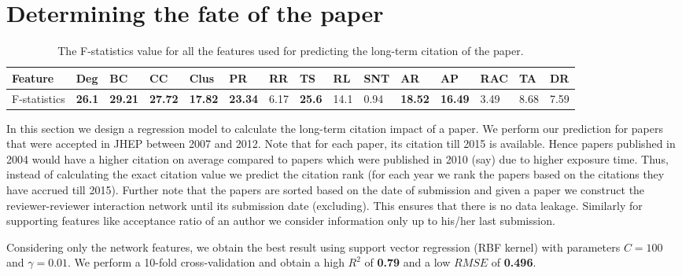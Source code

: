 \section{Determining the fate of the paper}
\label{performance_measure}

\begin{table*}[]
\centering
\caption{The F-statistics value for all the features used for predicting the long-term citation of the paper.}
\label{tab:f_score}
 \begin{adjustbox}{max width=\textwidth}
\begin{tabular}{|l|l|l|l|l|l|l|l|l|l|l|l|l|l|l|}
\hline
Feature      & Deg  & BC    & CC    & Clus  & PR    & RR   & TS   & RL   & SNT  & AR    & AP    & RAC  & TA   & DR   \\ \hline
F-statistics & {\bf 26.1} & {\bf 29.21} & {\bf 27.72} & {\bf 17.82} & {\bf 23.34} & 6.17 & {\bf 25.6} & 14.1 & 0.94 & {\bf 18.52} & {\bf 16.49} & 3.49 & 8.68 & 7.59 \\ \hline
\end{tabular}
\end{adjustbox}
\vspace{4mm}
\end{table*}


In this section we design a regression model to calculate the long-term citation impact of a paper. 
We perform our prediction for papers that were accepted in JHEP between 2007 and 2012. Note that for each paper, its citation till 2015 is available. Hence papers published in 2004 would have a higher citation on average compared to papers which were published in 2010 (say) due to higher exposure time. Thus, instead of calculating  the exact citation value we predict the citation rank (for each year we rank the papers based on the citations they have accrued till 2015). Further note that the papers are sorted based on the date of submission and given a paper we construct the reviewer-reviewer interaction network until its submission date (excluding). This ensures that there is no data leakage. Similarly for supporting features like acceptance ratio of an author we consider information only up to his/her last submission. 

 Considering only the network features, we obtain the best result using support vector regression (RBF kernel) with parameters $C=100$ and $\gamma=0.01$. We perform a 10-fold cross-validation and obtain a high $R^2$ of {\bf 0.79} and a low $RMSE$ of {\bf 0.496}. 

